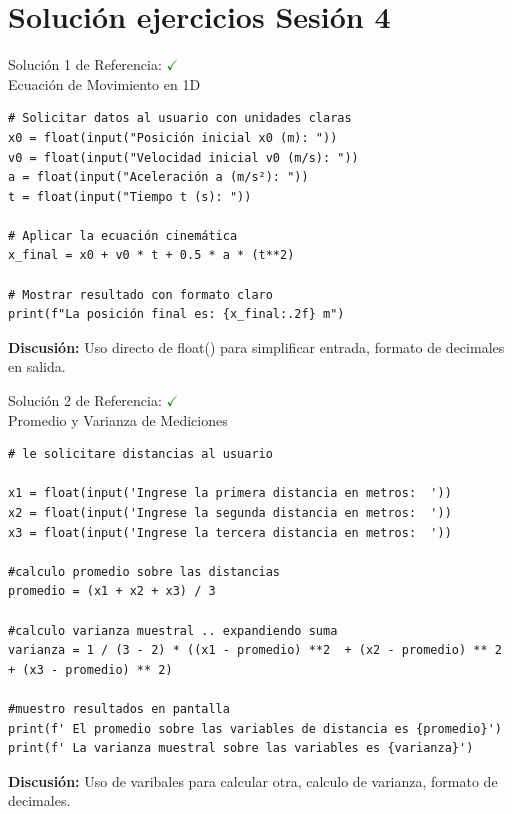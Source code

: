 \documentclass[10pt]{beamer}
\begin{document}
\myfront{}

\begin{frame}
  \titlepage
\end{frame}




\section{Solución ejercicios Sesión 4}



\begin{frame}[fragile]{Solución 1 de Referencia: \hfill \textcolor{green}{$\checkmark$} \\ Ecuación de Movimiento en 1D}
\begin{verbatim}
# Solicitar datos al usuario con unidades claras
x0 = float(input("Posición inicial x0 (m): "))
v0 = float(input("Velocidad inicial v0 (m/s): "))
a = float(input("Aceleración a (m/s²): "))
t = float(input("Tiempo t (s): "))

# Aplicar la ecuación cinemática
x_final = x0 + v0 * t + 0.5 * a * (t**2)

# Mostrar resultado con formato claro
print(f"La posición final es: {x_final:.2f} m")
\end{verbatim}
\textbf{Discusión:} Uso directo de float() para simplificar entrada, formato de decimales en salida.
\end{frame}



\begin{frame}[fragile]{Solución 2 de Referencia: \hfill \textcolor{green}{$\checkmark$} \\ Promedio y Varianza de Mediciones}
\begin{verbatim}
# le solicitare distancias al usuario 

x1 = float(input('Ingrese la primera distancia en metros:  '))
x2 = float(input('Ingrese la segunda distancia en metros:  '))
x3 = float(input('Ingrese la tercera distancia en metros:  '))

#calculo promedio sobre las distancias 
promedio = (x1 + x2 + x3) / 3 

#calculo varianza muestral .. expandiendo suma
varianza = 1 / (3 - 2) * ((x1 - promedio) **2  + (x2 - promedio) ** 2 + (x3 - promedio) ** 2)

#muestro resultados en pantalla 
print(f' El promedio sobre las variables de distancia es {promedio}')
print(f' La varianza muestral sobre las variables es {varianza}')
\end{verbatim}
\textbf{Discusión:} Uso de varibales para calcular otra,  calculo de varianza, formato de decimales.
\end{frame}
            
\end{document}

